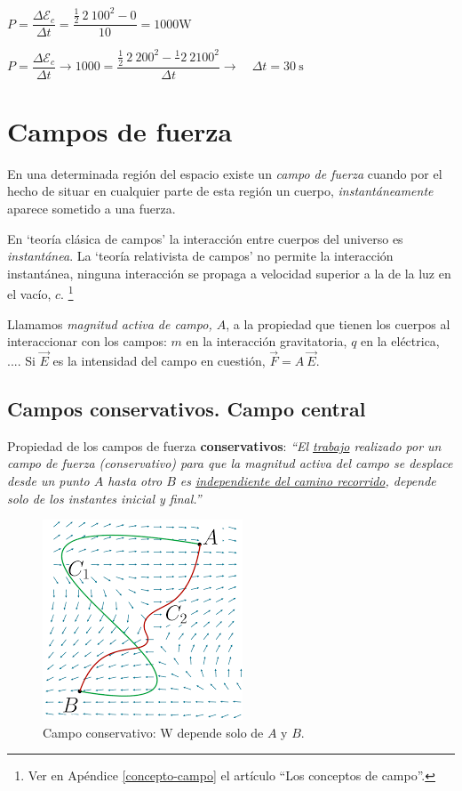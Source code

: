 $P=\dfrac{\Delta \mathcal E_c}{\Delta t}=\dfrac{\frac 1 2 \ 2 \ 100^2 - 0}{10}=1000 \mathrm{W}$

$P=\dfrac{\Delta \mathcal E_c}{\Delta t} \to 1000=\dfrac{\frac 1 2 \ 2 \ 200^2 - \frac 1 \ 2 \ 2 100^2}{\Delta t} \to \quad \Delta t=30\ \mathrm{s}$


\section{Campos de fuerza}

En una determinada región del espacio existe un \emph{campo de fuerza} cuando por el hecho de situar en cualquier parte de esta región un cuerpo, \emph{instantáneamente} aparece sometido a una fuerza.

En `teoría clásica de campos' la interacción entre cuerpos del universo es \emph{instantánea}. La `teoría relativista de campos'  no permite la interacción instantánea, ninguna interacción se propaga a velocidad superior a la de la luz en el vacío, $c$. \footnote{Ver en Apéndice \ref{concepto-campo} el artículo ``Los conceptos de campo''.}

Llamamos \emph{magnitud activa de campo, $A$}, a la propiedad que tienen los cuerpos al interaccionar con los campos: $m$ en la interacción gravitatoria, $q$ en la eléctrica, .... Si $\vec E$ es la intensidad del campo en cuestión, $\vec F=A\ \vec E$.

\subsection{Campos conservativos. Campo central}

\begin{multicols}{2}
Propiedad de los campos de fuerza \textbf{conservativos}: \emph{``El \underline{trabajo} realizado por un campo de fuerza (conservativo) para que la magnitud activa del campo se desplace desde un punto $A$ hasta otro $B$ es \underline{independiente del camino recorrido}, depende solo de los instantes inicial y final.''}
\begin{figure}[H]
		\centering
		\includegraphics[width=.3\textwidth]{imagenes/imagenes03/T03IM09.png}
		\caption*{\footnotesize{Campo conservativo: W depende solo de $A$ y $B$}\normalsize{.}}
		\end{figure}
\end{multicols}

